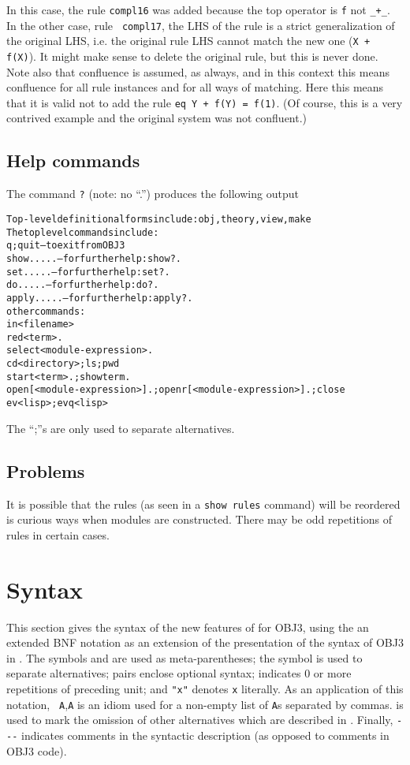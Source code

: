 In this case, the rule {\tt compl16} was added because the top
operator is {\tt f} not {\tt \_+\_}.  In the other case, rule {\tt
  compl17}, the LHS of the rule is a strict generalization of the
original LHS, i.e. the original rule LHS cannot match the new one
({\tt X + f(X)}).  It might make sense to delete the original rule,
but this is never done.  Note also that confluence is assumed, as
always, and in this context this means confluence for all rule
instances and for all ways of matching.  Here this means that it is
valid not to add the rule {\tt eq Y + f(Y) = f(1)}.  (Of course, this
is a very contrived example and the original system was not
confluent.)

\subsection{Help commands}
The command {\tt ?} (note: no ``.'') produces the following output
\begin{alltt}
    Top-level definitional forms include: obj, theory, view, make
    The top level commands include:
      q; quit --- to exit from OBJ3
      show .... .  --- for further help: show ? .
      set .... . --- for further help: set ? .
      do .... . --- for further help: do ? .
      apply .....  --- for further help: apply ? .
      other commands:
        in <filename>
        red <term> .
        select <module-expression> .
        cd <directory>; ls; pwd
        start <term> .; show term .
        open [<module-expression>] .; openr [<module-expression>] .; close
        ev <lisp>; evq <lisp>
\end{alltt}
The ``;''s are only used to separate alternatives.

\subsection{Problems}
It is possible that the rules (as seen in a {\tt show rules} command)
will be reordered is curious ways when modules are constructed.  There
may be odd repetitions of rules in certain cases.

\section{Syntax} \label{Syntax}
This section gives the syntax of the new features of for OBJ3, using
the an extended BNF notation as an extension of the presentation of
the syntax of OBJ3 in \cite{iobj3}.  The symbols {\lsg} and {\rsg} are
used as meta-parentheses; the symbol {\alt} is used to separate
alternatives; {\lopt} {\ropt} pairs enclose optional syntax; {\itr}
indicates 0 or more repetitions of preceding unit; and {\tt "x"}
denotes {\tt x} literally.  As an application of this notation, {{\tt
    A}{\lsg},{\tt A}\rsg\itr} is an idiom used for a non-empty list of
{\tt A}s separated by commas.  {\tt \omt} is used to mark the omission
of other alternatives which are described in \cite{iobj3}.  Finally,
\verb|---| indicates comments in the syntactic description (as opposed
to comments in OBJ3 code).

